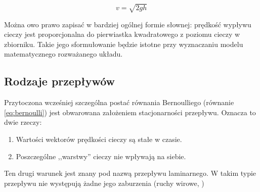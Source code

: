 \begin{equation}\label{eq:torricelli}
	v = \sqrt{2gh}
\end{equation}

Można owo prawo zapisać w bardziej ogólnej formie słownej: prędkość wypływu cieczy jest proporcjonalna do pierwiastka kwadratowego z poziomu cieczy w zbiorniku. Takie jego sformułowanie będzie istotne przy wyznaczaniu modelu matematycznego rozważanego układu.


\subsection{Rodzaje przepływów}
\label{sub:plyny-przeplywy}

Przytoczona wcześniej szczególna postać równania Bernoulliego (równanie \ref{eq:bernoulli}) jest obwarowana założeniem stacjonarności przepływu. Oznacza to dwie rzeczy:
\begin{enumerate}
    \item Wartości wektorów prędkości cieczy są stałe w czasie.
    \item Poszczególne ,,warstwy'' cieczy nie wpływają na siebie.
\end{enumerate}

Ten drugi warunek jest znany pod nazwą przepływu laminarnego. W takim typie przepływu nie występują żadne jego zaburzenia (ruchy wirowe, )